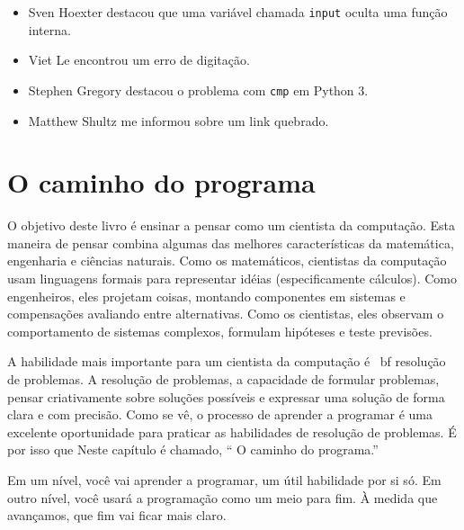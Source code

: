 \documentclass[10pt]{book}
\begin{document}
\begin {itemize}
\item Sven Hoexter destacou que uma variável chamada {\tt input}
oculta uma função interna.

\item Viet Le encontrou um erro de digitação.

\item Stephen Gregory destacou o problema com {\tt cmp}
em Python 3.

\item Matthew Shultz me informou sobre um link quebrado.


\end{itemize}

\normalsize
\clearemptydoublepage

\begin{latexonly}

\tableofcontents

\clearemptydoublepage

\end{latexonly}

\mainmatter

\chapter{O caminho do programa}

O objetivo deste livro é ensinar a pensar como um
cientista da computação. Esta maneira de pensar combina algumas das melhores características
da matemática, engenharia e ciências naturais. Como os matemáticos,
cientistas da computação usam linguagens formais para representar idéias (especificamente
cálculos). Como engenheiros, eles projetam coisas, montando componentes
em sistemas e compensações avaliando entre alternativas. Como os cientistas,
eles observam o comportamento de sistemas complexos, formulam hipóteses e teste
previsões.

A habilidade mais importante para um cientista da computação é {\ bf
resolução de problemas}. A resolução de problemas, a capacidade de formular
problemas, pensar criativamente sobre soluções possíveis e expressar uma solução de forma clara
e com precisão. Como se vê, o processo de aprender a programar é uma
excelente oportunidade para praticar as habilidades de resolução de problemas. É por isso que
Neste capítulo é chamado, `` O caminho do programa.''

Em um nível, você vai aprender a programar, um útil
habilidade por si só. Em outro nível, você usará a programação como um meio para
fim. À medida que avançamos, que fim vai ficar mais claro.
\end{document}
